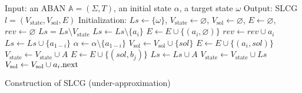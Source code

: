 \begin{algorithm}[ht]
\begin{algorithmic}
    \State Input: an ABAN $\mathbb{A}=(\Sigma,T)$, an initial state $\alpha$, a target state $\omega$
    \State Output: SLCG $l=(V_{\mathrm{state}},V_{\mathrm{sol}}, E)$
    \State Initialization: 
    $Ls\gets \{\omega\}$, $V_{\mathrm{state}}\gets\varnothing$, $V_{\mathrm{sol}}\gets \varnothing$, $E\gets \varnothing$, $rev\gets \varnothing$
        \State $Ls=Ls\setminus V_{\mathrm{state}}$
    		\State $Ls\gets Ls\setminus \{a_i\}$
    			\State $E\gets E\cup \{(a_i,\varnothing)\}$
    			\State $rev\gets rev\cup a_i$
        	\Else
        	        \State $Ls\gets Ls\cup \{a_{1-i}\}$
        	        \State $\alpha\gets\alpha\setminus\{a_{1-i}\}$
        	    \EndIf
        	    \State{\textcolor{gray}{// Choose the transitions reaching $a_i$}}
        		    \State $V_{\mathrm{sol}}\gets V_{\mathrm{sol}}\cup \{sol\}$
        		    \State $E\gets E\cup \{(a_i,sol)\} $
        			\State $V_{\mathrm{state}}\gets V_{\mathrm{state}}\cup {A}$
        				\State $E\gets E\cup \{(sol,b_j)\} $
        			\EndFor
        			\State $Ls\gets Ls\cup A$
                    \State $V_{\mathrm{state}}\gets V_{\mathrm{state}}\cup Ls$
        		\EndFor
        		\State$V_{\mathrm{sol}}\gets V_{\mathrm{sol}}\cup a_i{\rm .next}$           
        	\EndIf
    	\EndFor
    \EndWhile
    \State{}
\end{algorithmic}
\caption{Construction of SLCG (under-approximation)}\label{AlgConstructLCGUnder}
\end{algorithm}

